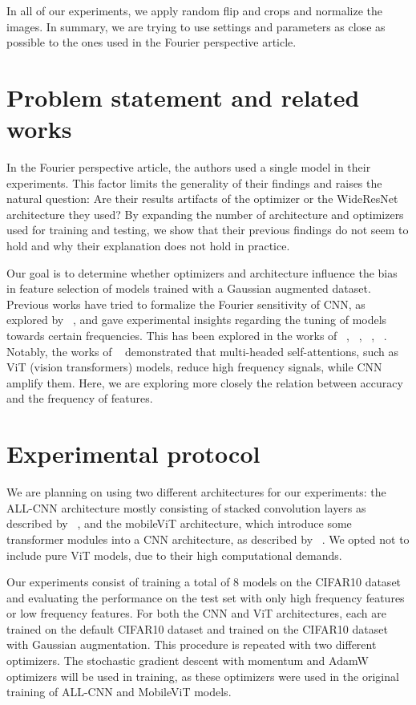 \documentclass{article} \author{Simon Théorêt}
\begin{document}
In all of our experiments, we apply random flip and crops and
normalize the images. In summary, we are trying to use settings and
parameters as close as possible to the ones used in the Fourier
perspective article.

\section{Problem statement and related works}
In the Fourier perspective article, the authors used a single model in
their experiments. This factor limits the generality of their findings
and raises the natural question: Are their results artifacts of the
optimizer or the WideResNet architecture they used? By expanding the
number of architecture and optimizers used for training and testing,
we show that their previous findings do not seem to hold and why their
explanation does not hold in practice.

Our goal is to determine whether optimizers and architecture influence
the bias in feature selection of models trained with a Gaussian
augmented dataset. Previous works have tried
to formalize the Fourier sensitivity of CNN, as explored by
~\citep{krishnamachari2023fourier}, and gave experimental insights
regarding the tuning of models towards certain frequencies. This has
been explored in the works of ~\citep{krishnamachari2023fourier},
~\citep{geirhos2022imagenettrained}, ~\citep{yin2020fourier},
~\citep{mo2022adversarial}. Notably, the works of
~\citep{park2022vision} demonstrated that multi-headed
self-attentions, such as ViT (vision transformers) models, reduce high
frequency signals, while CNN amplify them. Here, we are exploring more
closely the relation between accuracy and the frequency of features.

\section{Experimental protocol}
We are planning on using two different architectures for our
experiments: the ALL-CNN architecture mostly consisting of stacked
convolution layers as described by ~\citep{springenberg2015striving},
and the mobileViT architecture, which introduce some transformer
modules into a CNN architecture, as described by
~\citep{mehta2022mobilevit}. We opted not to include pure ViT models,
due to their high computational demands.

Our experiments consist of training a total of 8 models on the CIFAR10
dataset and evaluating the performance on the test set with only high
frequency features or low frequency features. For both the CNN and ViT
architectures, each are trained on the default CIFAR10 dataset and
trained on the CIFAR10 dataset with Gaussian augmentation. This
procedure is repeated with two different optimizers. The stochastic
gradient descent with momentum and AdamW optimizers will be used in
training, as these optimizers were used in the original training of
ALL-CNN and MobileViT models.
\end{document}
